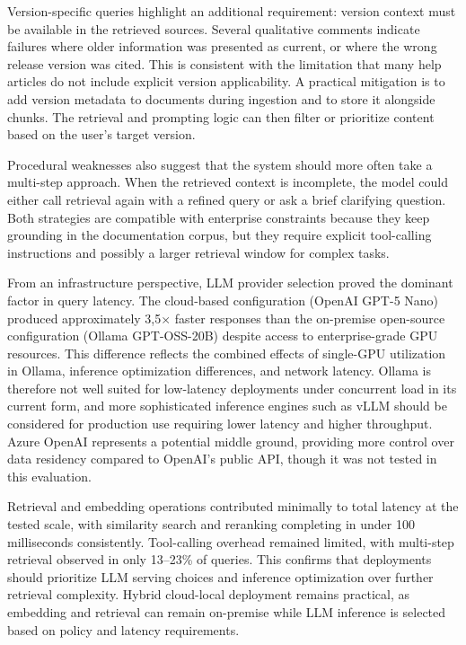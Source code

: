 Version-specific queries highlight an additional requirement: version context must be available in the retrieved sources. Several qualitative comments indicate failures where older information was presented as current, or where the wrong release version was cited. This is consistent with the limitation that many help articles do not include explicit version applicability. A practical mitigation is to add version metadata to documents during ingestion and to store it alongside chunks. The retrieval and prompting logic can then filter or prioritize content based on the user's target version.

Procedural weaknesses also suggest that the system should more often take a multi-step approach. When the retrieved context is incomplete, the model could either call retrieval again with a refined query or ask a brief clarifying question. Both strategies are compatible with enterprise constraints because they keep grounding in the documentation corpus, but they require explicit tool-calling instructions and possibly a larger retrieval window for complex tasks.

From an infrastructure perspective, LLM provider selection proved the dominant factor in query latency. The cloud-based configuration (OpenAI GPT-5 Nano) produced approximately 3,5$\times$ faster responses than the on-premise open-source configuration (Ollama GPT-OSS-20B) despite access to enterprise-grade GPU resources. This difference reflects the combined effects of single-GPU utilization in Ollama, inference optimization differences, and network latency. Ollama is therefore not well suited for low-latency deployments under concurrent load in its current form, and more sophisticated inference engines such as vLLM \parencite{umeshOllamaVsVLLM2025} should be considered for production use requiring lower latency and higher throughput. Azure OpenAI \parencite{microsoftWhatAzureOpenAI} represents a potential middle ground, providing more control over data residency compared to OpenAI's public API, though it was not tested in this evaluation.

Retrieval and embedding operations contributed minimally to total latency at the tested scale, with similarity search and reranking completing in under 100 milliseconds consistently. Tool-calling overhead remained limited, with multi-step retrieval observed in only 13--23\% of queries. This confirms that deployments should prioritize LLM serving choices and inference optimization over further retrieval complexity. Hybrid cloud-local deployment remains practical, as embedding and retrieval can remain on-premise while LLM inference is selected based on policy and latency requirements.

